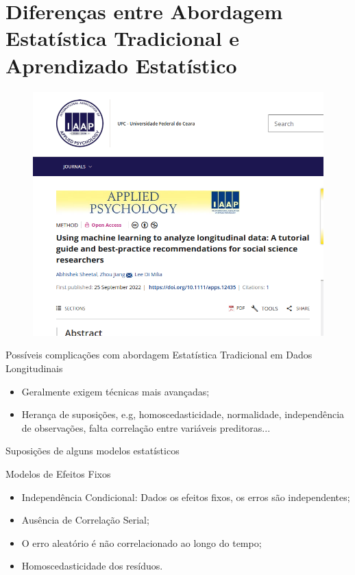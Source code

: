 \section{Diferenças entre Abordagem Estatística Tradicional e Aprendizado Estatístico}

\begin{frame}{}
	\begin{figure}[h]
		\includegraphics[scale=0.4]{imagens//secao2/artigo1.png}
	\end{figure}
\end{frame}


\begin{frame}{Possíveis complicações com abordagem Estatística Tradicional em Dados Longitudinais}
    \begin{block}{}
        \begin{itemize}
            \item Geralmente exigem técnicas mais avançadas;
            \item Herança de suposições, e.g, homoscedasticidade, normalidade, independência de observações, falta correlação entre variáveis preditoras...
        \end{itemize}
    \end{block}
\end{frame}

\begin{frame}{Suposições de alguns modelos estatísticos}
	\begin{block}{Modelos de Efeitos Fixos}
		\begin{itemize}
			\item Independência Condicional: Dados os efeitos fixos, os erros são independentes;
			\item Ausência de Correlação Serial; 
			\item O erro aleatório é não correlacionado ao longo do tempo;
			\item Homoscedasticidade dos resíduos.
		\end{itemize}
	\end{block}
\end{frame}

